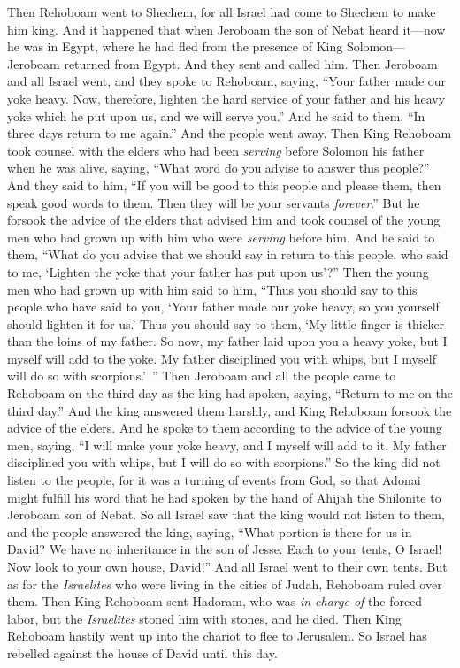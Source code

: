 \begin{biblechapter} %
 Then Rehoboam went to Shechem, for all Israel had come to Shechem to make him king.
\verse And it happened that when Jeroboam the son of Nebat heard it—now he was in Egypt, where he had fled from the presence of King Solomon—Jeroboam returned from Egypt.
\verse And they sent and called him. Then Jeroboam and all Israel went, and they spoke to Rehoboam, saying,
\verse “Your father made our yoke heavy. Now, therefore, lighten the hard service of your father and his heavy yoke which he put upon us, and we will serve you.”
\verse And he said to them, “In three days return to me again.” And the people went away.
\verse Then King Rehoboam took counsel with the elders who had been \textit{serving} before Solomon his father when he was alive, saying, “What word do you advise to answer this people?”
\verse And they said to him, “If you will be good to this people and please them, then speak good words to them. Then they will be your servants \textit{forever}.”
\verse But he forsook the advice of the elders that advised him and took counsel of the young men who had grown up with him who were \textit{serving} before him.
\verse And he said to them, “What do you advise that we should say in return to this people, who said to me, ‘Lighten the yoke that your father has put upon us’?”
\verse Then the young men who had grown up with him said to him, “Thus you should say to this people who have said to you, ‘Your father made our yoke heavy, so you yourself should lighten it for us.’ Thus you should say to them, ‘My little finger is thicker than the loins of my father.
\verse So now, my father laid upon you a heavy yoke, but I myself will add to the yoke. My father disciplined you with whips, but I myself will do so with scorpions.’ ”
\verse Then Jeroboam and all the people came to Rehoboam on the third day as the king had spoken, saying, “Return to me on the third day.”
\verse And the king answered them harshly, and King Rehoboam forsook the advice of the elders.
\verse And he spoke to them according to the advice of the young men, saying, “I will make your yoke heavy, and I myself will add to it. My father disciplined you with whips, but I will do so with scorpions.”
\verse So the king did not listen to the people, for it was a turning of events from God, so that Adonai might fulfill his word that he had spoken by the hand of Ahijah the Shilonite to Jeroboam son of Nebat.
\verse So all Israel saw that the king would not listen to them, and the people answered the king, saying, “What portion is there for us in David? We have no inheritance in the son of Jesse. Each to your tents, O Israel! Now look to your own house, David!” And all Israel went to their own tents.
\verse But as for the \textit{Israelites} who were living in the cities of Judah, Rehoboam ruled over them.
\verse Then King Rehoboam sent Hadoram, who was \textit{in charge of} the forced labor, but the \textit{Israelites} stoned him with stones, and he died. Then King Rehoboam hastily went up into the chariot to flee to Jerusalem.
\verse So Israel has rebelled against the house of David until this day.
\end{biblechapter}

